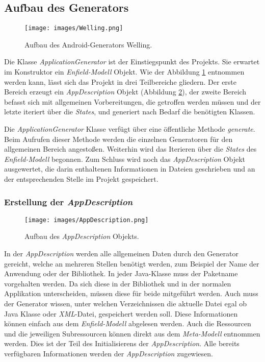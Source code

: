 \subsection{Aufbau des Generators}

\begin{figure}[H]
	\begin{center}
		\texttt{[image: images/Welling.png]}
		\caption{Aufbau des Android-Generators Welling.}
		\label{fig:welling}
	\end{center}
\end{figure}


Die Klasse \textit{ApplicationGenerator} ist der Einstiegspunkt des Projekts. Sie erwartet im Konstruktor ein \textit{Enfield-Modell} Objekt. Wie der Abbildung \ref{fig:welling} entnommen werden kann, lässt sich das Projekt in drei Teilbereiche gliedern. Der erste Bereich erzeugt ein \textit{AppDescription} Objekt (Abbildung \ref{fig:appDescription}), der zweite Bereich befasst sich mit allgemeinen Vorbereitungen, die getroffen werden müssen und der letzte iteriert über die \textit{States}, und generiert nach Bedarf die benötigten Klassen.

Die \textit{ApplicationGenerator} Klasse verfügt über eine öffentliche Methode \textit{generate}. Beim Aufrufen dieser Methode werden die einzelnen Generatoren für den allgemeinen Bereich angestoßen. Weiterhin wird das Iterieren über die \textit{States} des \textit{Enfield-Modell} begonnen. Zum Schluss wird noch das \textit{AppDescription} Objekt ausgewertet, die darin enthaltenen Informationen in Dateien geschrieben und an der entsprechenden Stelle im Projekt gespeichert.

\subsubsection{Erstellung der \textit{AppDescription}}

\begin{figure}[H]
	\begin{center}
		\texttt{[image: images/AppDescription.png]}
		\caption{Aufbau des \textit{AppDescription} Objekts.}
		\label{fig:appDescription}
	\end{center}
\end{figure}

In der \textit{AppDescription} werden alle allgemeinen Daten durch den Generator gereicht, welche an mehreren Stellen benötigt werden, zum Beispiel der Name der Anwendung oder der Bibliothek. In jeder Java-Klasse muss der Paketname vorgehalten werden. Da sich diese in der Bibliothek und in der normalen Applikation unterscheiden, müssen diese für beide mitgeführt werden. Auch muss der Generator wissen, unter welchen Verzeichnissen die aktuelle Datei egal ob Java Klasse oder \textit{XML}-Datei, gespeichert werden soll. 
Diese Informationen können einfach aus dem \textit{Enfield-Modell} abgelesen werden. Auch die Ressourcen und die jeweiligen Subressourcen können direkt aus dem \textit{Meta-Modell} entnommen werden.  Dies ist der Teil des Initialisierens der \textit{AppDescription}. Alle bereits verfügbaren Informationen werden der \textit{AppDescription} zugewiesen. 

